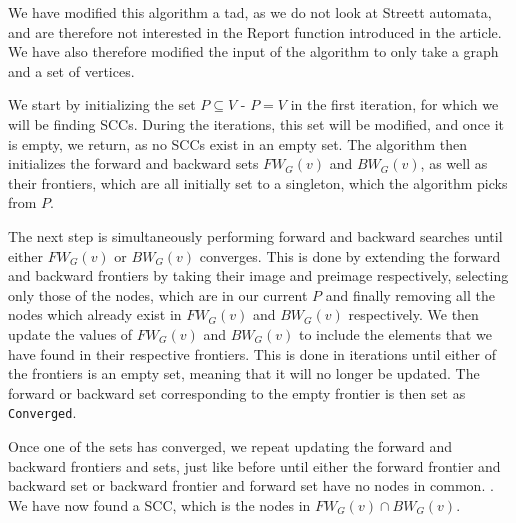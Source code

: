 \documentclass[../master/master.tex]{subfiles}
\newcommand{\FW}[2][G]{\ensuremath{FW_{#1}(#2)}}
\newcommand{\BW}[2][G]{\ensuremath{BW_{#1}(#2)}}
\begin{document}
We have modified this algorithm a tad, as we do not look at Streett automata, and are therefore not interested in the Report function introduced in the article. We have also therefore modified the input of the algorithm to only take a graph and a set of vertices. 

We start by initializing the set $P\subseteq V$ - $P=V$ in the first iteration, for which we will be finding SCCs. During the iterations, this set will be modified, and once it is empty, we return, as no SCCs exist in an empty set. The algorithm then initializes the forward and backward sets \FW{v} and \BW{v}, as well as their frontiers, which are all initially set to a singleton, which the algorithm picks from $P$.

The next step is simultaneously performing forward and backward searches until either \FW{v} or \BW{v} converges. This is done by extending the forward and backward frontiers by taking their image and preimage respectively, selecting only those of the nodes, which are in our current $P$ and finally removing all the nodes which already exist in \FW{v} and \BW{v} respectively. We then update the values of \FW{v} and \BW{v} to include the elements that we have found in their respective frontiers. This is done in iterations until either of the frontiers is an empty set, meaning that it will no longer be updated. The forward or backward set corresponding to the empty frontier is then set as \texttt{Converged}.

Once one of the sets has converged, we repeat updating the forward and backward frontiers and sets, just like before until either the forward frontier and backward set or backward frontier and forward set have no nodes in common. .
We have now found a SCC, which is the nodes in $\FW{v}\cap\BW{v}$. 
\end{document}

